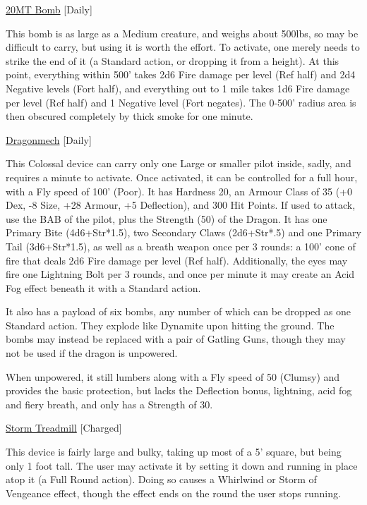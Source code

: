 \medskip\noindent\underline{20MT Bomb} [Daily] 

\noindent This bomb is as large as a Medium creature, and weighs about 500lbs, so may be difficult to carry, but using it is worth the effort. To activate, one merely needs to strike the end of it (a Standard action, or dropping it from a height). At this point, everything within 500' takes 2d6 Fire damage per level (Ref half) and 2d4 Negative levels (Fort half), and everything out to 1 mile takes 1d6 Fire damage per level (Ref half) and 1 Negative level (Fort negates). The 0-500' radius area is then obscured completely by thick smoke for one minute. 

\medskip\noindent\underline{Dragonmech} [Daily] 

\noindent This Colossal device can carry only one Large or smaller pilot inside, sadly, and requires a minute to activate. Once activated, it can be controlled for a full hour, with a Fly speed of 100' (Poor). It has Hardness 20, an Armour Class of 35 (+0 Dex, -8 Size, +28 Armour, +5 Deflection), and 300 Hit Points. If used to attack, use the BAB of the pilot, plus the Strength (50) of the Dragon. It has one Primary Bite (4d6+Str*1.5), two Secondary Claws (2d6+Str*.5) and one Primary Tail (3d6+Str*1.5), as well as a breath weapon once per 3 rounds: a 100' cone of fire that deals 2d6 Fire damage per level (Ref half). Additionally, the eyes may fire one Lightning Bolt per 3 rounds, and once per minute it may create an Acid Fog effect beneath it with a Standard action. 

\smallskip\noindent It also has a payload of six bombs, any number of which can be dropped as one Standard action. They explode like Dynamite upon hitting the ground. The bombs may instead be replaced with a pair of Gatling Guns, though they may not be used if the dragon is unpowered. 

\smallskip\noindent When unpowered, it still lumbers along with a Fly speed of 50 (Clumsy) and provides the basic protection, but lacks the Deflection bonus, lightning, acid fog and fiery breath, and only has a Strength of 30. 

\medskip\noindent\underline{Storm Treadmill} [Charged] 

\noindent This device is fairly large and bulky, taking up most of a 5' square, but being only 1 foot tall. The user may activate it by setting it down and running in place atop it (a Full Round action). Doing so causes a Whirlwind or Storm of Vengeance effect, though the effect ends on the round the user stops running. 

